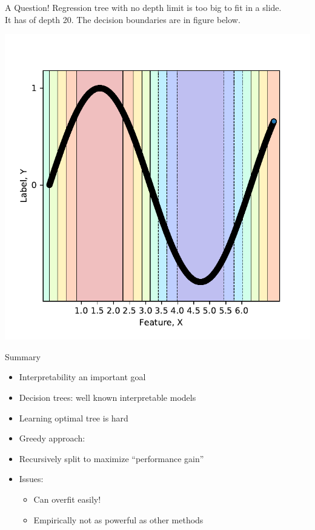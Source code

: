 \documentclass{beamer}
\begin{document}
\begin{frame}{A Question!}
Regression tree with no depth limit is too big to fit in a slide. \\
It has of depth 20. The decision boundaries are in figure below.\\
\begin{center}
\includegraphics[scale=0.5]{decision-trees-regression/imgs/sine-no-depth-tree}
\end{center}
\end{frame}

\begin{frame}{Summary}
\begin{itemize}
	\item Interpretability an important goal
\item Decision trees: well known interpretable models
\item  Learning optimal tree is hard
\item  Greedy approach:
\item  Recursively split to maximize “performance gain”
\item  Issues:
\begin{itemize}
	\item Can overfit easily!
	\item  Empirically not as powerful as other methods
\end{itemize}
\end{itemize}

\end{frame}
\end{document}
